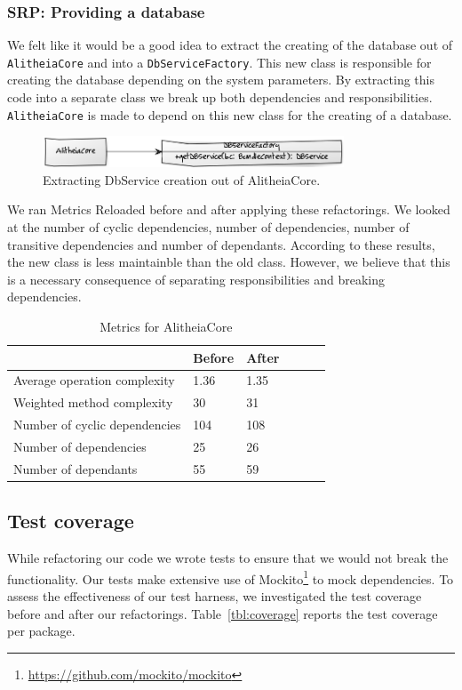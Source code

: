\documentclass{article}
\begin{document}
\subsubsection{SRP: Providing a database}
We felt like it would be a good idea to extract the creating of the database out of \verb|AlitheiaCore| and into a \verb|DbServiceFactory|. This new class is responsible for creating the database depending on the system parameters. By extracting this code into a separate class we break up both dependencies and responsibilities. \verb|AlitheiaCore| is made to depend on this new class for the creating of a database.

\begin{figure}[h]
    \centering
    \includegraphics[width=0.8\textwidth]{dbfactory}
    \caption{Extracting DbService creation out of AlitheiaCore.}
    \label{fig:dbfactory}
\end{figure}

We ran Metrics Reloaded before and after applying these refactorings. We looked at the number of cyclic dependencies, number of dependencies, number of transitive dependencies and number of dependants. According to these results, the new class is less maintainble than the old class. However, we believe that this is a necessary consequence of separating responsibilities and breaking dependencies.

\begin{table}
	\centering
    \begin{tabular}{l|llll}
    ~                                 & Before & After & ~ & ~ \\ \hline
    Average operation complexity      & 1.36   & 1.35 \\
    Weighted method complexity        & 30     & 31 \\
    Number of cyclic dependencies     & 104 & 108 \\
    Number of dependencies            & 25  & 26  \\
    Number of dependants              & 55  & 59  \\
    \end{tabular}
    \caption{Metrics for AlitheiaCore}
\end{table}

\subsection{Test coverage}
While refactoring our code we wrote tests to ensure that we would not break the functionality. Our tests make extensive use of Mockito\footnote{\url{https://github.com/mockito/mockito}} to mock dependencies. To assess the effectiveness of our test harness, we investigated the test coverage before and after our refactorings. Table~\ref{tbl:coverage} reports the test coverage per package.
\end{document}
